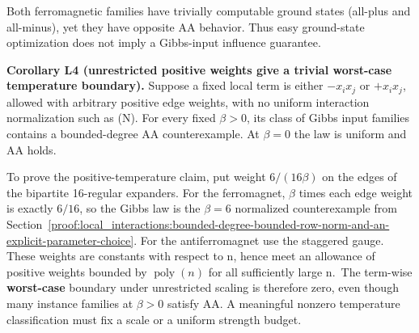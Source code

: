 Both ferromagnetic families have trivially computable ground states
(all-plus and all-minus), yet they have opposite AA behavior. Thus easy
ground-state optimization does not imply a Gibbs-input influence
guarantee.

\textbf{Corollary L4 (unrestricted positive weights give a trivial
worst-case temperature boundary).} Suppose a fixed local term is either
\(-x_ix_j\) or \(+x_ix_j\), allowed with arbitrary positive edge
weights, with no uniform interaction normalization such as (N). For
every fixed \(\beta >0\), its class of Gibbs input families contains a
bounded-degree AA counterexample. At \(\beta =0\) the law is uniform and
AA holds.

To prove the positive-temperature claim, put weight \(6/(16\beta )\) on
the edges of the bipartite 16-regular expanders. For the ferromagnet,
\(\beta\) times each edge weight is exactly \(6/16\), so the Gibbs law
is the \(\beta =6\) normalized counterexample from Section~\ref{proof:local_interactions:bounded-degree-bounded-row-norm-and-an-explicit-parameter-choice}. For the
antiferromagnet use the staggered gauge. These weights are constants
with respect to n, hence meet an allowance of positive weights bounded
by \(\operatorname{poly}(n)\) for all sufficiently large n.~The
term-wise \textbf{worst-case} boundary under unrestricted scaling is
therefore zero, even though many instance families at \(\beta >0\)
satisfy AA. A meaningful nonzero temperature classification must fix a
scale or a uniform strength budget.
